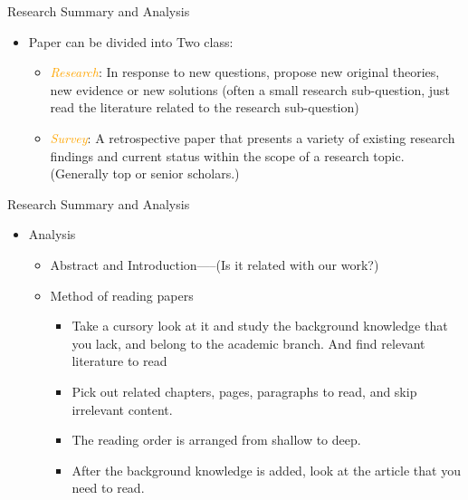 \documentclass[
 size=14pt,
 paper=smartboard,  %
 mode=present, 		%
 display=slides, 	%
 style=tuliplab,  	%
 pauseslide,
 fleqn,leqno]{powerdot}{}
\begin{document}
\begin{slide}{Research Summary and Analysis}

\begin{itemize}
  \item Paper can be divided into Two class:
  \begin{itemize}
    \item  \textcolor{orange}{\textit{Research}}: In response to new questions, propose new original theories, new evidence or new solutions (often a small research sub-question, just read the literature related to the research sub-question)
    \item  \textcolor{orange}{\textit{Survey}}: A retrospective paper that presents a variety of existing research findings and current status within the scope of a research topic. (Generally top or senior scholars.)
  \end{itemize}
\end{itemize}
\end{slide}

\begin{slide}[toc=,bm=]{Research Summary and Analysis}

\begin{itemize}
  \item Analysis
  \begin{itemize}
    \item Abstract and Introduction-----(Is it related with our work?)
    \item Method of reading papers
    \begin{itemize}
      \item Take a cursory look at it and study the background knowledge that you lack, and belong to the academic branch. And find relevant literature to read
      \item  Pick out related chapters, pages, paragraphs to read, and skip irrelevant content.
      \item The reading order is arranged from shallow to deep.
      \item After the background knowledge is added, look at the article that you need to read.
    \end{itemize}
  \end{itemize}
\end{itemize}
\end{slide}
\end{document}
